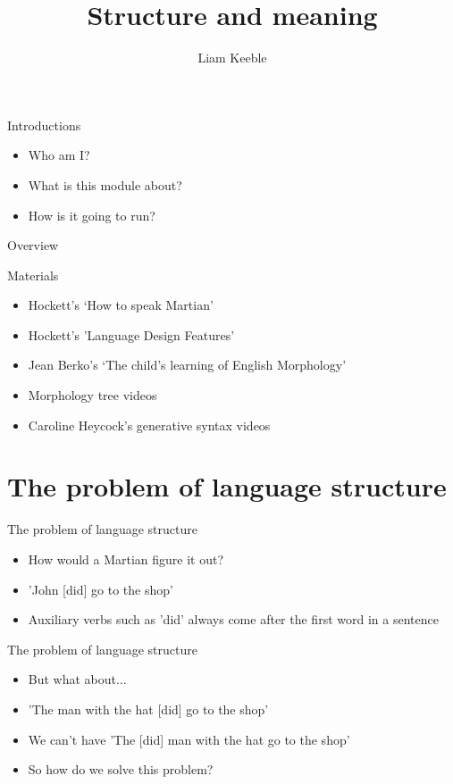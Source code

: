\documentclass{beamer}
\title{Structure and meaning}
\author{Liam Keeble}
\institute{School of English Literature, Language and Linguistics}
\date{}
\begin{document}
\frame{\titlepage}

\begin{frame}{Introductions}
\begin{itemize}
\item Who am I?
\item What is this module about?
\item How is it going to run?
\end{itemize}
\end{frame}

\begin{frame}{Overview}
\tableofcontents
\end{frame}


\begin{frame}{Materials}
	\begin{itemize}

	\item Hockett's `How to speak Martian'
	\item Hockett's 'Language Design Features'
	\item Jean Berko's `The child's learning of English Morphology'
	\item Morphology tree videos
	\item Caroline Heycock's generative syntax videos

	\end{itemize}

\end{frame}


\section{The problem of language structure}

\begin{frame}{The problem of language structure}
	\begin{itemize}
	\item How would a Martian figure it out?
	\item 'John [did] go to the shop'
	\item Auxiliary verbs such as 'did' always come after the first word in a sentence
	\end{itemize}
\end{frame}

\begin{frame}{The problem of language structure}
	\begin{itemize}
	\item But what about...
	\item 'The man with the hat [did] go to the shop'
	\item We can't have 'The [did] man with the hat go to the shop'
	\item So how do we solve this problem?
	\end{itemize}

\end{frame}
\end{document}
